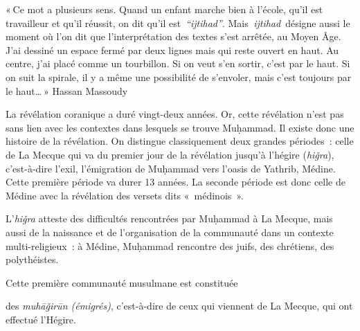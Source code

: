 \begin{cite}
« Ce mot a plusieurs sens. Quand un enfant marche bien à l'école, qu'il
est travailleur et qu'il réussit, on dit qu'il est~\emph{``ijtihad''}.
Mais  \emph{ijtihad}~désigne aussi le moment où l'on dit que
l'interprétation des textes s'est arrêtée, au Moyen Âge. J'ai dessiné un
espace fermé par deux lignes mais qui reste ouvert en haut. Au centre,
j'ai placé comme un tourbillon. Si on veut s'en sortir, c'est par le
haut. Si on suit la spirale, il y a même une possibilité de s'envoler,
mais c'est toujours par le haut\ldots{} » Hassan Massoudy
\end{cite}




La révélation coranique a duré vingt-deux années. Or, cette révélation
n'est pas sans lien avec les contextes dans lesquels se trouve Muḥammad.
Il existe donc une histoire de la révélation. On distingue classiquement
deux grandes périodes~: celle de La Mecque qui va du premier jour de la
révélation jusqu'à l'hégire (\emph{hiǧra}), c'est-à-dire l'exil,
l'émigration de Muḥammad vers l'oasis de Yathrib, Médine. Cette première
période va durer 13 années. La seconde période est donc celle de Médine
avec la révélation des versets dits «~médinois~».

L'\emph{hiǧra}   atteste des difficultés rencontrées par Muḥammad à
La Mecque, mais aussi de la naissance et de l'organisation de la
communauté dans un contexte multi-religieux~: à Médine, Muḥammad
rencontre des juifs, des chrétiens, des polythéistes.

Cette première communauté musulmane est constituée
\bi
\item des \emph{muhāǧirūn (émigrés)}, c'est-à-dire de ceux qui viennent de
La Mecque, qui ont effectué l'Hégire.

